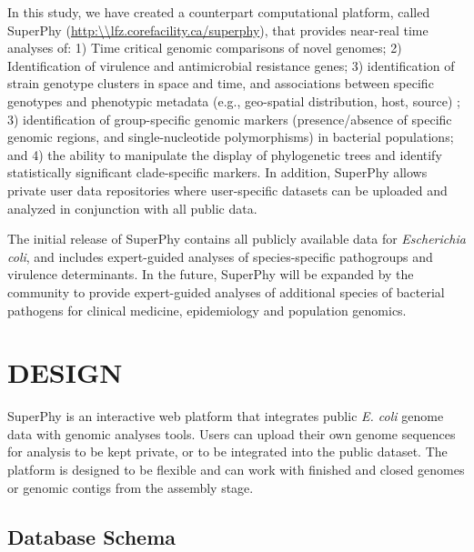 \documentclass[a4paper,twoside]{article}
\begin{document}
In this study, we have created a counterpart computational platform, called SuperPhy (\url{http:\\lfz.corefacility.ca/superphy}), that provides near-real time analyses of: 1) Time critical genomic comparisons of novel genomes; 2) Identification of virulence and antimicrobial resistance genes; 3) identification of strain genotype clusters in space and time, and associations between specific genotypes and phenotypic metadata (e.g., geo-spatial distribution, host, source) ; 3) identification of group-specific genomic markers (presence/absence of specific genomic regions, and single-nucleotide polymorphisms) in bacterial populations; and 4) the ability to manipulate the display of phylogenetic trees and identify statistically significant clade-specific markers. In addition, SuperPhy allows private user data repositories where user-specific datasets can be uploaded and analyzed in conjunction with all public data.

The initial release of SuperPhy contains all publicly available data for \textit{Escherichia coli}, and includes expert-guided analyses of species-specific pathogroups and virulence determinants. In the future, SuperPhy will be expanded by the community to provide expert-guided analyses of additional species of bacterial pathogens for clinical medicine, epidemiology and population genomics.

\section{\uppercase{Design}}
\label{sec:design}

\noindent SuperPhy is an interactive web platform that integrates public \textit{E. coli} genome data with genomic analyses tools.  Users can upload their own genome sequences for analysis to be kept private, or to be integrated into the public dataset. The platform is designed to be flexible and can work with finished and closed genomes or genomic contigs from the assembly stage. 

\subsection{Database Schema}
\end{document}
